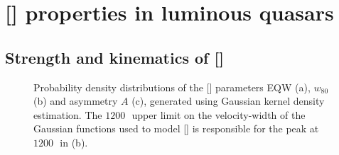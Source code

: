 \section{[] properties in luminous quasars}

\subsection{Strength and kinematics of []}
\label{sec:ch4-basicresults}

\begin{figure}
    \captionsetup[subfigure]{labelformat=empty}
    \centering
    \subfloat[\label{fig:parameter_hists_a}]{}
    \subfloat[\label{fig:parameter_hists_b}]{}
    \subfloat[\label{fig:parameter_hists_c}]{}
    \caption[{Probability density distributions of the [] parameters EQW, $w_{80}$ and asymmetry $A$.}]{Probability density distributions of the [] parameters EQW (a), $w_{80}$ (b) and asymmetry $A$ (c), generated using Gaussian kernel density estimation. The $1200$\,\kms\, upper limit on the velocity-width of the Gaussian functions used to model [] is responsible for the peak at $1200$\,\kms\, in (b).}
    \label{fig:parameter_hists}
\end{figure}

